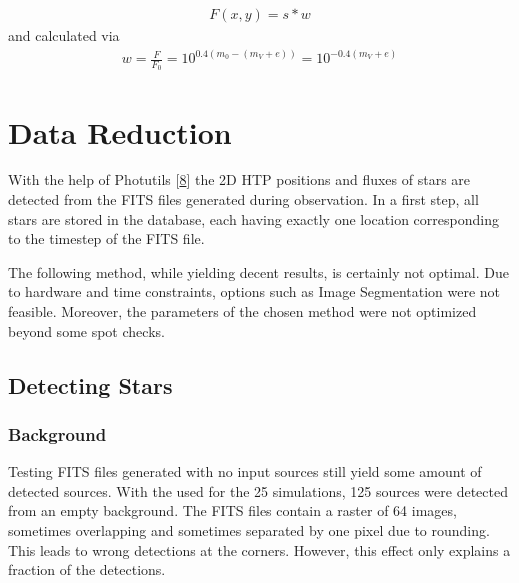 \documentclass[letterpaper,10pt,english]{sphinxmanual}
\begin{document}
\begin{equation*}
\begin{split}F\left (x,y \right ) = s * w\end{split}
\end{equation*}
\sphinxAtStartPar
and calculated via
\begin{equation*}
\begin{split}w = \frac{F}{F_0} = 10^{0.4\left ( m_0-(m_V+e) \right )}=10^{-0.4 (m_V+e)}\end{split}
\end{equation*}

\chapter{Data Reduction}
\label{\detokenize{NBodySimulation/DataReduction:data-reduction}}\label{\detokenize{NBodySimulation/DataReduction::doc}}
\sphinxAtStartPar
With the help of Photutils {[}\hyperlink{cite.NBodySimulation/Appendix:id54}{8}{]} the 2D HTP positions and fluxes of stars are detected from the FITS files generated during observation.
In a first step, all stars are stored in the database, each having exactly one location corresponding to the timestep of the FITS file.

\sphinxAtStartPar
The following method, while yielding decent results, is certainly not optimal.
Due to hardware and time constraints, options such as Image Segmentation were not feasible. Moreover, the parameters of the chosen method were not optimized beyond some spot checks.


\section{Detecting Stars}
\label{\detokenize{NBodySimulation/DataReduction:detecting-stars}}

\subsection{Background}
\label{\detokenize{NBodySimulation/DataReduction:background}}\label{\detokenize{NBodySimulation/DataReduction:background-label}}
\sphinxAtStartPar
Testing FITS files generated with no input sources still yield some amount of detected sources.
With the {\hyperref[\detokenize{NBodySimulation/Experiments:parameters-label}]{}} used for the 25 simulations, 125 sources were detected from an empty background.
The FITS files contain a raster of 64 images, sometimes overlapping and sometimes separated by one pixel due to rounding.
This leads to wrong detections at the corners. However, this effect only explains a fraction of the detections.
\end{document}
